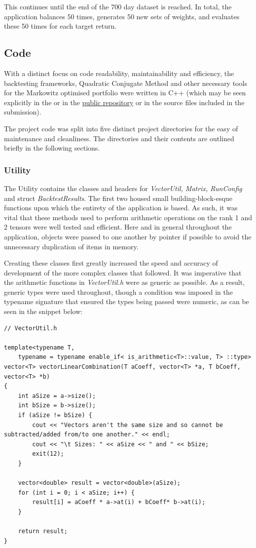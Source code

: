 \documentclass{article}
\begin{document}
This continues until the end of the 700 day dataset is reached. In total, the application balances 50 times, generates 50 new sets of weights, and evaluates these 50 times for each target return.


\subsection{Code}
\label{sec:implementation_code}


With a distinct focus on code readability, maintainability and efficiency, the backtesting frameworks, Quadratic Conjugate Method and other necessary tools for the Markowitz optimised portfolio were written in C++ (which may be seen explicitly in the or in the \href{https://github.com/indipanesar96/markowitzportfoliooptimiser}{public repository} or in the source files included in the submission).


The project code was split into five distinct project directories for the easy of maintenance and cleanliness. The directories and their contents are outlined briefly in the following sections.



\subsubsection{Utility}
\label{sec:utility}

The Utility contains the classes and headers for \textit{VectorUtil, Matrix, RunConfig} and struct \textit{BacktestResults}. The first two housed small building-block-esque functions upon which the entirety of the application is based. As such, it was vital that these methods used to perform arithmetic operations on the rank 1 and 2 tensors were well tested and efficient. Here and in general throughout the application, objects were passed to one another by pointer if possible to avoid the unnecessary duplication of items in memory.

Creating these classes first greatly increased the speed and accuracy of development of the more complex classes that followed.
It was imperative that the arithmetic functions in \textit{VectorUtil.h} were as generic as possible. As a result, generic types were used throughout, though a condition was imposed in the typename signature that ensured the types being passed were numeric, as can be seen in the snippet below:


\begin{lstlisting}
// VectorUtil.h

template<typename T,
	typename = typename enable_if< is_arithmetic<T>::value, T> ::type>
vector<T> vectorLinearCombination(T aCoeff, vector<T> *a, T bCoeff, vector<T> *b) 
{
	int aSize = a->size();
	int bSize = b->size();
	if (aSize != bSize) {
		cout << "Vectors aren't the same size and so cannot be subtracted/added from/to one another." << endl;
		cout << "\t Sizes: " << aSize << " and " << bSize;
		exit(12);
	}
	
	vector<double> result = vector<double>(aSize);
	for (int i = 0; i < aSize; i++) {
		result[i] = aCoeff * a->at(i) + bCoeff* b->at(i);
	}

	return result;
}
\end{lstlisting}
\end{document}
